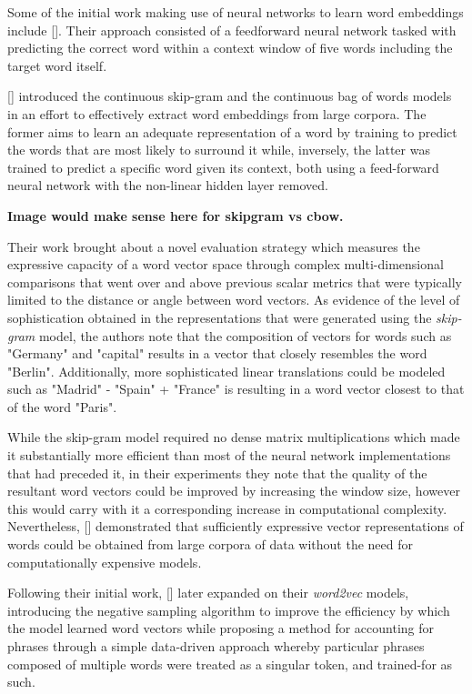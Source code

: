 \documentclass[12pt, a4paper]{report}
\theoremstyle{definition}
\theoremstyle{definition}%
\theoremstyle{definition}%
\theoremstyle{definition}%
\theoremstyle{definition}%
\theoremstyle{definition}%
\renewcommand{\cite}[1]{[\citealp{#1}]}
\begin{document}
Some of the initial work making use of neural networks to learn word embeddings include \cite{collobert2008}. Their approach consisted of a feedforward neural network tasked with predicting the correct word within a context window of five words including the target word itself.

\cite{mikolov2013} introduced the continuous skip-gram and the continuous bag of words models in an effort to effectively extract word embeddings from large corpora. The former aims to learn an adequate representation of a word by training to predict the words that are most likely to surround it while, inversely, the latter was trained to predict a specific word given its context, both using a feed-forward neural network with the non-linear hidden layer removed. 

\textbf{Image would make sense here for skipgram vs cbow.}

Their work brought about a novel evaluation strategy which measures the expressive capacity of a word vector space through complex multi-dimensional comparisons that went over and above previous scalar metrics that were typically limited to the distance or angle between word vectors. As evidence of the level of sophistication obtained in the representations that were generated using the \textit{skip-gram} model, the authors note that the composition of vectors for words such as "Germany" and "capital" results in a vector that closely resembles the word "Berlin". Additionally, more sophisticated linear translations could be modeled such as "Madrid" - "Spain" + "France" is resulting in a word vector closest to that of the word "Paris".

While the skip-gram model required no dense matrix multiplications which made it substantially more efficient than most of the neural network implementations that had preceded it, in their experiments they note that the quality of the resultant word vectors could be improved by increasing the window size, however this would carry with it a corresponding increase in computational complexity. Nevertheless, \cite{mikolov2013} demonstrated that sufficiently expressive vector representations of words could be obtained from large corpora of data without the need for computationally expensive models.

Following their initial work, \cite{mikolov2013b} later expanded on their \textit{word2vec} models, introducing the negative sampling algorithm to improve the efficiency by which the model learned word vectors while proposing a method for accounting for phrases through a simple data-driven approach whereby particular phrases composed of multiple words were treated as a singular token, and trained-for as such.
\end{document}
